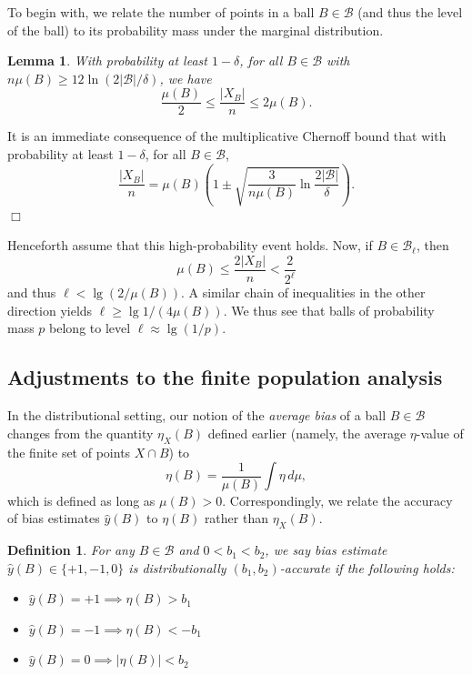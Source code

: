 \documentclass{article}
\def\B{{\mathcal B}}
\def\yh{{\widehat{y}}}
\newtheorem{lemma}[thm]{Lemma}
\newtheorem{defn}[thm]{Definition}
\newenvironment{proof}{\noindent {\sc Proof:}}{$\Box$ \medskip}
\begin{document}
To begin with, we relate the number of points in a ball $B \in \B$ (and thus the level of the ball) to its probability mass under the marginal distribution.
\begin{lemma}
With probability at least $1-\delta$, for all $B \in \B$ with $n \mu(B) \geq 12 \ln (2|\B|/\delta)$, we have
$$ \frac{\mu(B)}{2} \leq \frac{|X_B|}{n} \leq 2 \mu(B) .$$
\label{lemma:ball-size-bounds}
\end{lemma}
\begin{proof}
It is an immediate consequence of the multiplicative Chernoff bound that with probability at least $1-\delta$, for all $B \in \B$,
$$ \frac{|X_B|}{n} = \mu(B) \left(1 \pm \sqrt{\frac{3}{n \mu(B)} \ln \frac{2|\B|}{\delta}} \right) .$$
\end{proof}

Henceforth assume that this high-probability event holds. Now, if $B \in \B_\ell$, then
$$ \mu(B) \leq \frac{2 |X_B|}{n} < \frac{2}{2^\ell} $$
and thus $\ell < \lg (2/\mu(B))$. A similar chain of inequalities in the other direction yields $\ell \geq \lg 1/(4 \mu(B))$. We thus see that balls of probability mass $p$ belong to level $\ell \approx \lg (1/p)$.

\subsection{Adjustments to the finite population analysis}

In the distributional setting, our notion of the \emph{average bias} of a ball $B \in \B$ changes from the quantity $\eta_X(B)$ defined earlier (namely, the average $\eta$-value of the finite set of points $X \cap B$) to
$$ \eta(B) = \frac{1}{\mu(B)} \int \eta \, d\mu ,$$
which is defined as long as $\mu(B) > 0$. Correspondingly, we relate the accuracy of bias estimates $\yh(B)$ to $\eta(B)$ rather than $\eta_X(B)$.
\begin{defn}
For any $B \in \B$ and $0 < b_1 < b_2$, we say bias estimate $\yh(B) \in \{+1,-1,0\}$ is \emph{distributionally $(b_1,b_2)$-accurate} if the following holds:
\begin{itemize}
\item $\yh(B) = +1 \implies \eta(B) > b_1$
\item $\yh(B) = -1 \implies \eta(B) < -b_1$
\item $\yh(B) = 0 \implies |\eta(B)| < b_2$
\end{itemize}
\label{def:accurate-bias-estimate-dist}
\end{defn}
\end{document}
